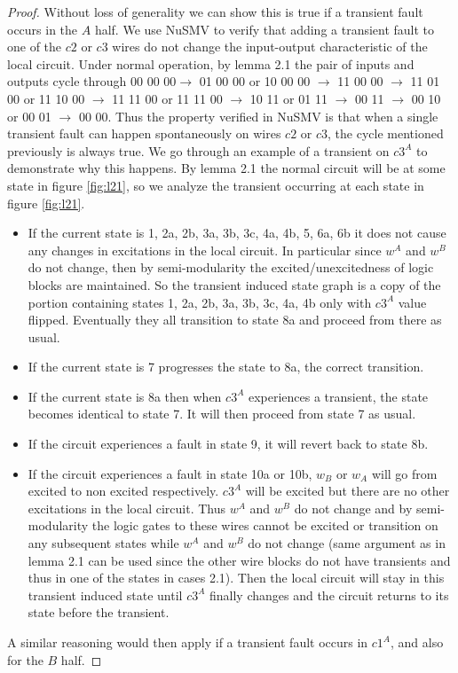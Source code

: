 \documentclass[12pt]{report}
\begin{document}
\begin{proof}
Without loss of generality we can show this is true if a transient fault occurs in the $A$ half.  We use NuSMV to verify that adding a transient fault to one of the $c2$ or $c3$ wires do not change the input-output characteristic of the local circuit.  Under normal operation, by lemma 2.1 the pair of inputs and outputs cycle through 00 00 00$\rightarrow$ 01 00 00 or 10 00 00 $\rightarrow$ 11 00 00 $\rightarrow$ 11 01 00 or 11 10 00 $\rightarrow$ 11 11 00 or 11 11 00 $\rightarrow$ 10 11 or 01 11 $\rightarrow$ 00 11 $\rightarrow$ 00 10 or 00 01 $\rightarrow$ 00 00.  Thus the property verified in NuSMV is that when a single transient fault can happen spontaneously on wires $c2$ or $c3$, the cycle mentioned previously is always true.    %
We go through an example of a transient on $c3^A$ to demonstrate why this happens.  By lemma 2.1 the normal circuit will be at some state in figure \ref{fig:l21}, so we analyze the transient occurring at each state in figure \ref{fig:l21}.
\begin{itemize}
	\item
If the current state is 1, 2a, 2b, 3a, 3b, 3c, 4a, 4b, 5, 6a, 6b it does not cause any changes in excitations in the local circuit.  In particular since $w^A$ and $w^B$ do not change, then by semi-modularity the excited/unexcitedness of logic blocks are maintained.  So the transient induced state graph is a copy of the portion containing states 1, 2a, 2b, 3a, 3b, 3c, 4a, 4b only with $c3^A$ value flipped. Eventually they all transition to state 8a and proceed from there as usual.
	\item
If the current state is 7 progresses the state to 8a, the correct transition.	
	\item
      If the current state is 8a then when $c3^A$ experiences a transient, the state
 becomes identical to state 7.  It will then proceed from state 7 as usual.   
	\item
If the circuit experiences a fault in state 9, it will revert back to state 8b.  
	\item
If the circuit experiences a fault in state 10a or 10b, $w_B$ or $w_A$ will go from excited to non excited respectively.  $c3^A$ will be excited but there are no other excitations in the local circuit.  Thus $w^A$ and $w^B$ do not change and by semi-modularity the logic gates to these wires cannot be excited or transition on any subsequent states while $w^A$ and $w^B$ do not change (same argument as in lemma 2.1 can be used since the other wire blocks do not have transients and thus in one of the states in cases 2.1).  Then the local circuit will stay in this transient induced state until $c3^A$ finally changes and the circuit returns to its state before the transient.
\end{itemize}
A similar reasoning would then apply if a transient fault occurs in $c1^A$, and also for the $B$ half.  
\end{proof}
\end{document}
